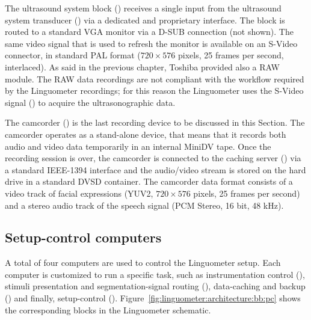 The ultrasound system block () receives a single input from the
ultrasound system transducer () via a dedicated and proprietary
interface. The  block is routed to a standard VGA monitor via a D-SUB
connection (not shown). 
The same video signal that is used to refresh the monitor is available on
an S-Video connector, in standard PAL format ($720\times576$ pixels, 25 frames
per second, interlaced).
As said in the previous chapter, Toshiba provided also a RAW module. 
The RAW data recordings are not compliant with the workflow required by the
Linguometer recordings; for this reason the Linguometer uses the S-Video
signal () to acquire the 
ultrasonographic data.

The camcorder () is the last recording device to be discussed in this
Section.
The camcorder operates as a stand-alone device, that means that it records
both audio and video data temporarily in an internal MiniDV tape.
Once the recording session is over, the camcorder is connected to the caching
server () via a standard IEEE-1394 interface and the audio/video
stream is stored on the hard drive in a standard DVSD container.
The camcorder data format consists of a video track of facial expressions (YUV2,
$720\times576$ pixels, 25 frames per second) and a stereo audio track 
of the speech signal (PCM Stereo, 16 bit, 48 kHz).
\subsection{Setup-control computers}
A total of four computers are used to control the Linguometer setup.
Each computer is customized to run a specific task, such as instrumentation 
control (), stimuli presentation and segmentation-signal routing 
(), data-caching and backup () and finally, setup-control 
().
Figure~\ref{fig:linguometer:architecture:bb:pc} shows the corresponding blocks
in the Linguometer schematic.


